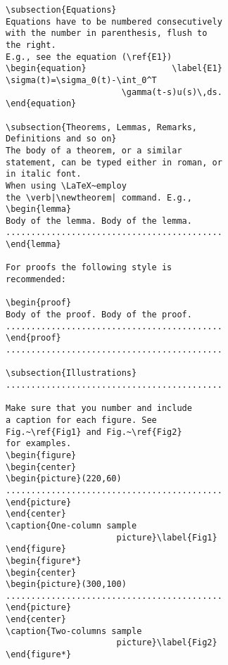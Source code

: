 \documentclass{physcon}
\begin{document}
\begin{verbatim}
\subsection{Equations}
Equations have to be numbered consecutively 
with the number in parenthesis, flush to 
the right. 
E.g., see the equation (\ref{E1})
\begin{equation}                 \label{E1}                 
\sigma(t)=\sigma_0(t)-\int_0^T 
                       \gamma(t-s)u(s)\,ds.
\end{equation}

\subsection{Theorems, Lemmas, Remarks, 
Definitions and so on}
The body of a theorem, or a similar 
statement, can be typed either in roman, or 
in italic font. 
When using \LaTeX~employ 
the \verb|\newtheorem| command. E.g.,
\begin{lemma}
Body of the lemma. Body of the lemma. 
...........................................
\end{lemma}

For proofs the following style is 
recommended:

\begin{proof}
Body of the proof. Body of the proof. 
...........................................
\end{proof}
...........................................

\subsection{Illustrations}
...........................................
 
Make sure that you number and include 
a caption for each figure. See 
Fig.~\ref{Fig1} and Fig.~\ref{Fig2} 
for examples.
\begin{figure}
\begin{center}
\begin{picture}(220,60)
...........................................
\end{picture}
\end{center}
\caption{One-column sample 
                      picture}\label{Fig1}
\end{figure}
\begin{figure*}
\begin{center}
\begin{picture}(300,100)
...........................................
\end{picture}
\end{center}
\caption{Two-columns sample 
                      picture}\label{Fig2}
\end{figure*}


\end{verbatim}
\end{document}
